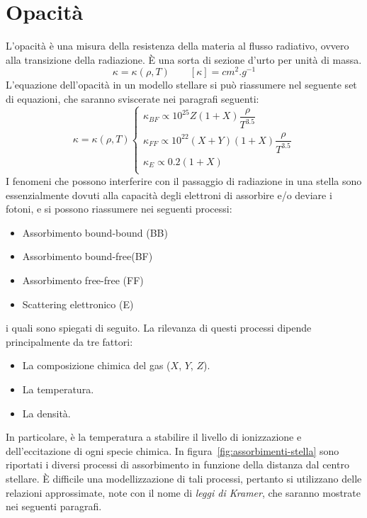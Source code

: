 \section{Opacità}\label{sec:opacità}
L'opacità è una misura della resistenza della materia al flusso radiativo, ovvero alla transizione della radiazione. È una sorta di sezione d'urto per unità di massa.
\[
\kappa = \kappa(\rho, T) \qquad [\kappa] = \si{cm^2.g^{-1}}
\]
L'equazione dell'opacità in un modello stellare si può riassumere nel seguente set di equazioni, che saranno sviscerate nei paragrafi seguenti:
\begin{equation}\label{eq:opacità}
    \kappa = \kappa(\rho, T) 
    \begin{cases} 
    \kappa_{BF} \propto 10^{25} Z(1 + X) \dfrac{\rho}{T^{3.5}} \\ 
    \kappa_{FF} \propto 10^{22} (X+Y)(1+X) \dfrac{\rho}{T^{3.5}} \\ 
    \kappa_{E} \propto 0.2 (1+X) \\ 
    \end{cases}
\end{equation}
I fenomeni che possono interferire con il passaggio di radiazione in una stella sono essenzialmente dovuti alla capacità degli elettroni di assorbire e/o deviare i fotoni, e si possono riassumere nei seguenti processi:
\begin{itemize}
    \item Assorbimento bound-bound (BB)
    \item Assorbimento bound-free(BF)
    \item Assorbimento free-free (FF)
    \item Scattering elettronico (E)
\end{itemize}
i quali sono spiegati di seguito. La rilevanza di questi processi dipende principalmente da tre fattori:
\begin{itemize}
    \item La composizione chimica del gas ($X$, $Y$, $Z$).
    \item La temperatura.
    \item La densità.
\end{itemize}
In particolare, è la temperatura a stabilire il livello di ionizzazione e dell'eccitazione di ogni specie chimica. In figura~\ref{fig:assorbimenti-stella} sono riportati i diversi processi di assorbimento in funzione della distanza dal centro stellare. È difficile una modellizzazione di tali processi, pertanto si utilizzano delle relazioni approssimate, note con il nome di \emph{leggi di Kramer}, che saranno mostrate nei seguenti paragrafi.

